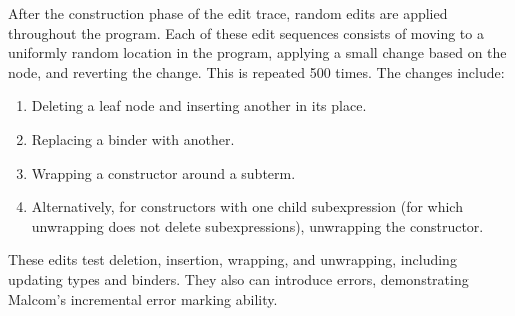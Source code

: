 After the construction phase of the edit trace, random edits are applied throughout the program. Each of these edit sequences consists of moving to a uniformly random location in the program, applying a small change based on the node, and reverting the change. This is repeated 500 times. The changes include:
\begin{enumerate}
    \item Deleting a leaf node and inserting another in its place.
    \item Replacing a binder with another.
    \item Wrapping a constructor around a subterm.
    \item Alternatively, for constructors with one child subexpression (for which unwrapping does not delete subexpressions), unwrapping the constructor.
\end{enumerate}
These edits test deletion, insertion, wrapping, and unwrapping, including updating types and binders. They also can introduce errors, demonstrating Malcom's incremental error marking ability.

